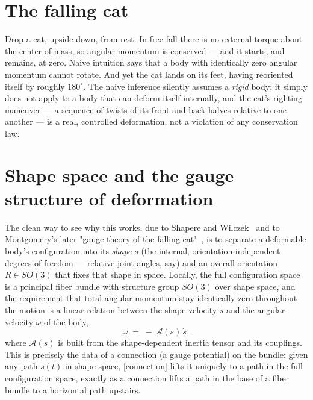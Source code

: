 \section{The falling cat}

Drop a cat, upside down, from rest. In free fall there is no
external torque about the center of mass, so angular momentum is
conserved --- and it starts, and remains, at zero. Naive intuition
says that a body with identically zero angular momentum cannot
rotate. And yet the cat lands on its feet, having reoriented itself
by roughly $180^\circ$. The naive inference silently assumes a
\emph{rigid} body; it simply does not apply to a body that can
deform itself internally, and the cat's righting maneuver --- a
sequence of twists of its front and back halves relative to one
another --- is a real, controlled deformation, not a violation of
any conservation law.

\section{Shape space and the gauge structure of deformation}

The clean way to see why this works, due to Shapere and
Wilczek~\cite{shapere+wilczek} and to Montgomery's later "gauge
theory of the falling cat"~\cite{montgomery}, is to separate a
deformable body's configuration into its \emph{shape} $s$ (the
internal, orientation-independent degrees of freedom --- relative
joint angles, say) and an overall orientation $R\in SO(3)$ that fixes
that shape in space. Locally, the full configuration space is a
principal fiber bundle with structure group $SO(3)$ over shape space,
and the requirement that total angular momentum stay identically
zero throughout the motion is a linear relation between the shape
velocity $\dot s$ and the angular velocity $\omega$ of the body,
\begin{equation}
  \omega \;=\; -\,\mathcal A(s)\,\dot s ,
  \label{connection}
\end{equation}
where $\mathcal A(s)$ is built from the shape-dependent inertia
tensor and its couplings. This is precisely the data of a connection
(a gauge potential) on the bundle: given any path $s(t)$ in shape
space, \eqref{connection} lifts it uniquely to a path in the full
configuration space, exactly as a connection lifts a path in the
base of a fiber bundle to a horizontal path upstairs.

